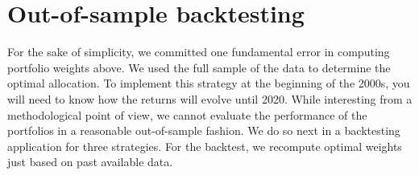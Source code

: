 \documentclass[
]{krantz}
\newenvironment{Shaded}{\begin{snugshade}}{\end{snugshade}}
\newcommand{\AttributeTok}[1]{\textcolor[rgb]{0.61,0.61,0.61}{#1}}
\newcommand{\ConstantTok}[1]{\textcolor[rgb]{0,0,0}{#1}}
\newcommand{\ControlFlowTok}[1]{\textcolor[rgb]{0.27,0.27,0.27}{\textbf{#1}}}
\newcommand{\DecValTok}[1]{\textcolor[rgb]{0.06,0.06,0.06}{#1}}
\newcommand{\FunctionTok}[1]{\textcolor[rgb]{0,0,0}{#1}}
\newcommand{\NormalTok}[1]{#1}
\newcommand{\OtherTok}[1]{\textcolor[rgb]{0.37,0.37,0.37}{#1}}
\newcommand{\SpecialCharTok}[1]{\textcolor[rgb]{0,0,0}{#1}}
\begin{document}
\begin{Shaded}
\end{Shaded}

\hypertarget{out-of-sample-backtesting}{%
\section{Out-of-sample backtesting}\label{out-of-sample-backtesting}}

For the sake of simplicity, we committed one fundamental error in computing portfolio weights above. We used the full sample of the data to determine the optimal allocation. To implement this strategy at the beginning of the 2000s, you will need to know how the returns will evolve until 2020. While interesting from a methodological point of view, we cannot evaluate the performance of the portfolios in a reasonable out-of-sample fashion. We do so next in a backtesting application for three strategies. For the backtest, we recompute optimal weights just based on past available data.
\end{document}
